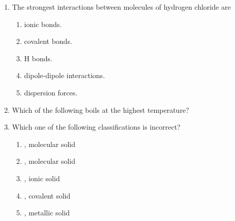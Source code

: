 \documentclass[main.tex]{subfiles}
\begin{document}
\begin{fullwidth}
\begin{multicols*}{2}
\begin{enumerate}
\item The strongest interactions between molecules of hydrogen chloride are
\begin{enumerate}[label=(\alph*)]
\item  ionic bonds.
\item  covalent bonds.
\item  H bonds.
\item  dipole-dipole interactions.
\item  dispersion forces.
\end{enumerate} 
\item Which of the following boils at the highest temperature?
\begin{enumerate}[label=(\alph*)]\vspace{-0.5cm}
\end{enumerate}\vspace{-0.5cm}

		
\item Which one of the following classifications is incorrect?
\begin{enumerate}[label=(\alph*)]
\item  {}, molecular solid
\item  {}, molecular solid
\item  {}, ionic solid
\item  {}, covalent solid
\item  {}, metallic solid
 \end{enumerate} 







    \setcounter{enumTempD}{\theenumi}
\end{enumerate}
\end{multicols*}
\end{fullwidth}
\clearpage
\newpage
\thispagestyle{empty}
\begin{fullwidth}
\begin{multicols}{2}\begin{enumerate}[resume]  \setlength\itemsep{0.2em}
    \setcounter{enumi}{\theenumTempD}


















 \end{enumerate}
\end{multicols}
\end{fullwidth}
\end{document}
